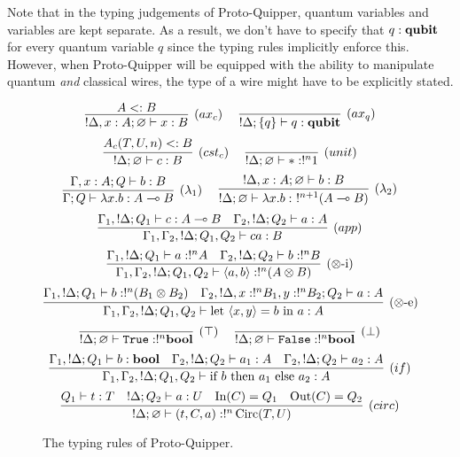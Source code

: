\documentclass[twoside]{article}
\begin{document}
Note that in the typing judgements of Proto-Quipper, quantum variables 
and variables are kept separate. As a result, we don't have to specify 
that $q:\textrm{\bf qubit}$ for every quantum variable $q$ since the typing rules 
implicitly enforce this. However, when Proto-Quipper will be equipped 
with the ability to manipulate quantum \emph{and} classical wires, the 
type of a wire might have to be explicitly stated.


\begin{figure}[!ht]
\begin{mdframed}
\[
\infer[(ax_c)]{!\Delta, x:A;\varnothing\entails x:B}{
  A<:B
}
~~~~
\infer[(ax_q)]{!\Delta;\s{q}\entails q:\qubit}{
} 
\]
\[
\infer[(cst_c)]{!\Delta;\varnothing \entails c:B}{
  A_{c}(T,U,n)<:B
} 
~~~~
\infer[(unit)]{!\Delta;\varnothing\entails *:!^n 1}{
}
\]
\[
\infer[(\lambda_1)]{\Gamma;Q\entails \lambda x.b:A\loli B}{
  \Gamma,x:A;Q \entails b:B
}
~~~~
\infer[(\lambda_2)]{!\Delta;\varnothing \entails \lambda x.b:~!^{n+1}(A\loli B)}{
  !\Delta, x:A;\varnothing \entails b:B
}
\]
\[
\infer[(app)]{\Gamma_1,\Gamma_2, !\Delta;Q_1,Q_2\entails ca:B}{
  \Gamma_1, !\Delta;Q_1\entails c:A\loli B 
  &
  \Gamma_2, !\Delta ;Q_2\entails a:A 
}
\]
\[
\infer[(\x\mbox{-i})]{\Gamma_1,\Gamma_2, !\Delta;Q_1,Q_2\entails \p{a,b}:!^n(A\x B)}{
  \Gamma_1, !\Delta;Q_1\entails a:!^nA 
  &
  \Gamma_2, !\Delta ;Q_2\entails b:!^nB
}
\]
\[
\infer[(\x\mbox{-e})]{\Gamma_1,\Gamma_2, !\Delta;Q_1,Q_2\entails \letin{\p{x,y}}{b}{a}:A}{
  \Gamma_1, !\Delta;Q_1\entails b:!^n(B_1\x B_2) 
  &
  \Gamma_2, !\Delta, x:!^nB_1, y:!^nB_2 ;Q_2\entails a:A
}
\]
\[
\infer[(\top)]{!\Delta;\varnothing\entails \true:!^n \bool}{
} 
~~~~
\infer[(\bot)]{!\Delta;\varnothing\entails \false:!^n \bool}{
}
\]
\[
\infer[(if)]{\Gamma_1,\Gamma_2, !\Delta;Q_1,Q_2\entails \ifthenelse{b}{a_1}{a_2}:A}{
  \Gamma_1, !\Delta;Q_1\entails b:\bool 
  &
  \Gamma_2, !\Delta;Q_2 \entails a_1:A ~~~ \Gamma_2, !\Delta;Q_2 \entails a_2:A
}
\]
\[
\infer[(circ)]{!\Delta;\varnothing \entails (t,C,a):!^n\Circ(T,U)}{
  Q_1\entails t:T 
  &
  !\Delta ; Q_2\entails a:U 
  &
  \In(C)=Q_1 
  &
  \Out(C)=Q_2
}
\]
\end{mdframed}
\caption{The typing rules of Proto-Quipper.}
\label{trules}
\end{figure}
\end{document}
